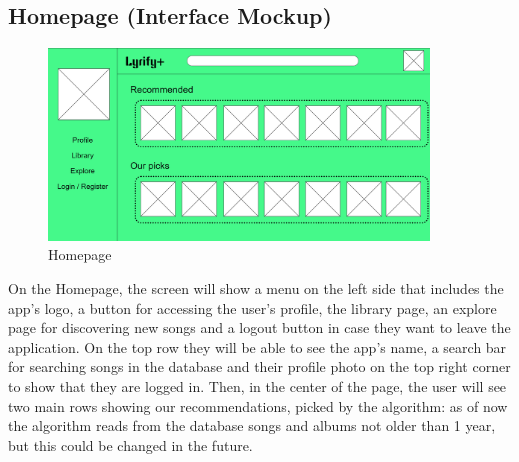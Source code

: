 \subsection{Homepage (Interface Mockup)}

\begin{figure}[h!]
\centering
\includegraphics[width=0.9\textwidth]{sections/PLL/HomePageMockup.png}
\caption{Homepage}
\end{figure}

On the Homepage, the screen will show a menu on the left side that includes the app's logo, a button for accessing the user's profile, the library page, an explore page for discovering new songs and a logout button in case they want to leave the application. On the top row they will be able to see the app's name, a search bar for searching songs in the database and their profile photo on the top right corner to show that they are logged in.
Then, in the center of the page, the user will see two main rows showing our recommendations, picked by the algorithm: as of now the algorithm reads from the database songs and albums not older than 1 year, but this could be changed in the future.